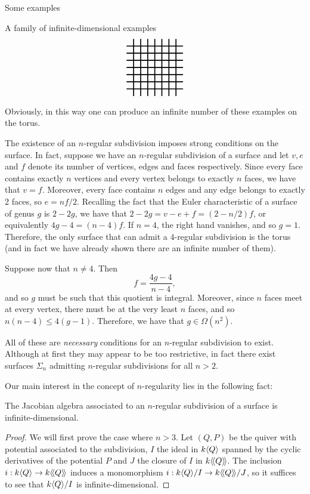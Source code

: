 \begin{chapter}{Some examples}
\begin{section}{A family of infinite-dimensional examples}
\[\begin{tikzpicture}[scale=1.2, very thick]
\foreach \x in {-0.75,-0.5, ..., 0.75}
{
\draw (3+\x, -1) to (3+\x, 1);
\draw (2, \x) to (4, \x);
}
\end{tikzpicture}
\]
Obviously, in this way one can produce an infinite number of these examples on the torus.

The existence of an $n$-regular subdivision imposes strong conditions on the surface. In fact, suppose we have an $n$-regular subdivision of a surface and let $v, e$ and $f$ denote its number of vertices, edges and faces respectively. Since every face contains exactly $n$ vertices and every vertex belongs to exactly $n$ faces, we have that $v=f$. Moreover, every face contains $n$ edges and any edge belongs to exactly 2 faces, so $e=nf/2$.
Recalling the fact that the Euler characteristic of a surface of genus $g$ is $2-2g$, we have that $2-2g=v-e+f=(2-n/2)f$, or equivalently $4g-4 = (n-4)f$. If $n=4$, the right hand vanishes, and so $g=1$. Therefore, the only surface that can admit a $4$-regular subdivision is the torus (and in fact we have already shown there are an infinite number of them).

Suppose now that $n\neq 4$. Then
\begin{equation}
\label{euler-regular}f=\frac{4g-4}{n-4},
\end{equation}and so $g$ must be such that this quotient is integral. Moreover, since $n$ faces meet at every vertex, there must be at the very least $n$ faces, and so $n(n-4)\leq 4(g-1)$. Therefore, we have that $g\in \Omega(n^2)$.

All of these are \emph{necessary} conditions for an $n$-regular subdivision to exist. Although at first they may appear to be too restrictive, in fact there exist surfaces $\Sigma_n$ admitting $n$-regular subdivisions for all $n>2$. \note{\textcolor{red}{completar esto cuando lo tengamos, si es que es cierto :)}}

Our main interest in the concept of $n$-regularity lies in the following fact:

\begin{thm} The Jacobian algebra associated to an $n$-regular subdivision of a surface is infinite-dimensional.
\end{thm}
\begin{proof} We will first prove the case where $n>3$. Let $(Q,P)$ be the quiver with potential associated to the subdivision, $I$ the ideal in $k\langle Q\rangle$ spanned by the cyclic derivatives of the potential $P$ and $J$ the closure of $I$ in $k\langle\!\langle Q\rangle\!\rangle$. The inclusion $i:k\langle Q\rangle\to k\langle\!\langle Q\rangle\!\rangle$ induces a monomorphism $i:k\langle Q\rangle/I \to k\langle\!\langle Q\rangle\!\rangle/J$, so it suffices to see that $k\langle Q\rangle/I$ is infinite-dimensional. 


\end{proof}
\end{section}
\end{chapter}
